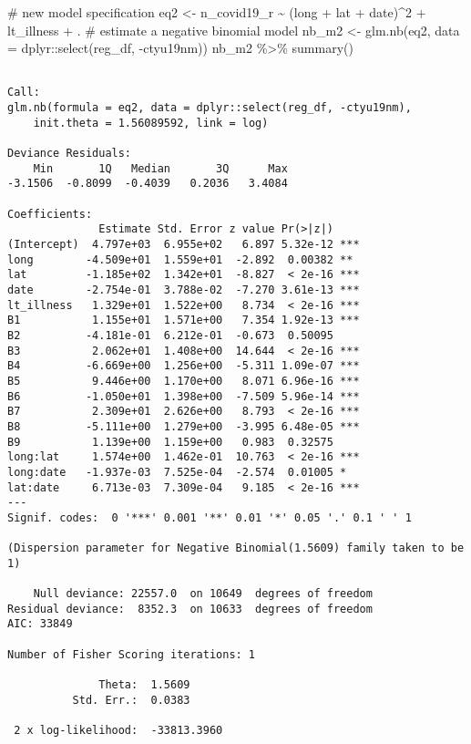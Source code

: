 \documentclass[
  letterpaper,
  krantz2]{style/krantz}
\newenvironment{Shaded}{\begin{snugshade}}{\end{snugshade}}
\newcommand{\AttributeTok}[1]{\textcolor[rgb]{0.40,0.45,0.13}{#1}}
\newcommand{\CommentTok}[1]{\textcolor[rgb]{0.37,0.37,0.37}{#1}}
\newcommand{\DecValTok}[1]{\textcolor[rgb]{0.68,0.00,0.00}{#1}}
\newcommand{\FunctionTok}[1]{\textcolor[rgb]{0.28,0.35,0.67}{#1}}
\newcommand{\NormalTok}[1]{\textcolor[rgb]{0.00,0.23,0.31}{#1}}
\newcommand{\OtherTok}[1]{\textcolor[rgb]{0.00,0.23,0.31}{#1}}
\newcommand{\SpecialCharTok}[1]{\textcolor[rgb]{0.37,0.37,0.37}{#1}}
\begin{document}
\begin{Shaded}
\begin{Highlighting}[]
\CommentTok{\# new model specification}
\NormalTok{eq2 }\OtherTok{\textless{}{-}}\NormalTok{ n\_covid19\_r }\SpecialCharTok{\textasciitilde{}}\NormalTok{ (long }\SpecialCharTok{+}\NormalTok{ lat }\SpecialCharTok{+}\NormalTok{ date)}\SpecialCharTok{\^{}}\DecValTok{2} \SpecialCharTok{+}\NormalTok{ lt\_illness }\SpecialCharTok{+}\NormalTok{ .}
\CommentTok{\# estimate a negative binomial model}
\NormalTok{nb\_m2 }\OtherTok{\textless{}{-}} \FunctionTok{glm.nb}\NormalTok{(eq2, }
       \AttributeTok{data =}\NormalTok{ dplyr}\SpecialCharTok{::}\FunctionTok{select}\NormalTok{(reg\_df, }\SpecialCharTok{{-}}\NormalTok{ctyu19nm))}
\NormalTok{nb\_m2 }\SpecialCharTok{\%\textgreater{}\%} \FunctionTok{summary}\NormalTok{()}
\end{Highlighting}
\end{Shaded}

\begin{verbatim}

Call:
glm.nb(formula = eq2, data = dplyr::select(reg_df, -ctyu19nm), 
    init.theta = 1.56089592, link = log)

Deviance Residuals: 
    Min       1Q   Median       3Q      Max  
-3.1506  -0.8099  -0.4039   0.2036   3.4084  

Coefficients:
              Estimate Std. Error z value Pr(>|z|)    
(Intercept)  4.797e+03  6.955e+02   6.897 5.32e-12 ***
long        -4.509e+01  1.559e+01  -2.892  0.00382 ** 
lat         -1.185e+02  1.342e+01  -8.827  < 2e-16 ***
date        -2.754e-01  3.788e-02  -7.270 3.61e-13 ***
lt_illness   1.329e+01  1.522e+00   8.734  < 2e-16 ***
B1           1.155e+01  1.571e+00   7.354 1.92e-13 ***
B2          -4.181e-01  6.212e-01  -0.673  0.50095    
B3           2.062e+01  1.408e+00  14.644  < 2e-16 ***
B4          -6.669e+00  1.256e+00  -5.311 1.09e-07 ***
B5           9.446e+00  1.170e+00   8.071 6.96e-16 ***
B6          -1.050e+01  1.398e+00  -7.509 5.96e-14 ***
B7           2.309e+01  2.626e+00   8.793  < 2e-16 ***
B8          -5.111e+00  1.279e+00  -3.995 6.48e-05 ***
B9           1.139e+00  1.159e+00   0.983  0.32575    
long:lat     1.574e+00  1.462e-01  10.763  < 2e-16 ***
long:date   -1.937e-03  7.525e-04  -2.574  0.01005 *  
lat:date     6.713e-03  7.309e-04   9.185  < 2e-16 ***
---
Signif. codes:  0 '***' 0.001 '**' 0.01 '*' 0.05 '.' 0.1 ' ' 1

(Dispersion parameter for Negative Binomial(1.5609) family taken to be 1)

    Null deviance: 22557.0  on 10649  degrees of freedom
Residual deviance:  8352.3  on 10633  degrees of freedom
AIC: 33849

Number of Fisher Scoring iterations: 1

              Theta:  1.5609 
          Std. Err.:  0.0383 

 2 x log-likelihood:  -33813.3960 
\end{verbatim}
\end{document}
